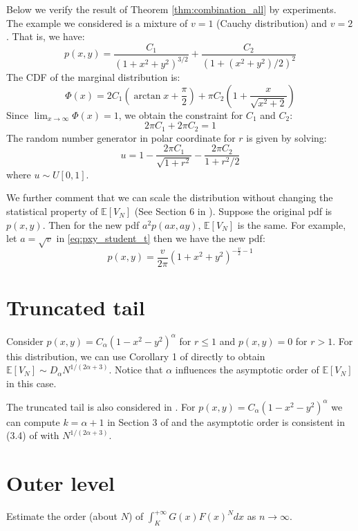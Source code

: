 \documentclass{article}
\def\E{\mathbb{E}}
\begin{document}
Below we verify the result of Theorem \ref{thm:combination_all}
by experiments. The example we considered is a mixture of $v=1$
(Cauchy distribution) and $v=2$. That is, we have:
\begin{equation}
    p(x,y) = \frac{C_1}{(1+x^2+y^2)^{3/2}}
    + \frac{C_2}{(1+(x^2+y^2)/2)^{2}}
\end{equation}
The CDF of the marginal distribution is:
\begin{equation}
    \Phi(x) = 2C_1 (\arctan x + \frac{\pi}{2})
    + \pi C_2 (1 + \frac{x}{\sqrt{x^2 + 2}})
\end{equation}
Since $\lim_{x\to \infty} \Phi(x) = 1$,
we obtain the constraint for $C_1$ and $C_2$:
\begin{equation}
2\pi C_1 + 2 \pi C_2 = 1    
\end{equation}
The random number generator in polar coordinate
for $r$ is given by solving:
\begin{equation}
    u = 1 - \frac{2\pi C_1}{\sqrt{1+r^2}} - \frac{2\pi C_2}{1+r^2/2}
\end{equation}
where $u\sim U[0,1]$.

We further comment that we can scale the distribution
without changing the statistical property of $\E[V_N]$
(See Section 6 in \cite{efron1965convex}).
Suppose the original pdf is $p(x,y)$. Then for the new
pdf $a^2 p(ax, ay)$, $\E[V_N]$ is the same.
For example,  let $a=\sqrt{v}$ in 
\eqref{eq:pxy_student_t} then we have the new
pdf:
\begin{equation}
    p(x,y)= \frac{v}{2\pi}(1+x^2+y^2)^{-\frac{v}{2}-1}
\end{equation}

\section{Truncated tail}
Consider  $p(x,y) = C_{\alpha}(1-x^2-y^2)^{\alpha}$ for $r\leq 1$
and $p(x,y)=0$ for $r>1$.
For this distribution, we can use
Corollary 1 of \cite{affentranger1991convex}
directly to obtain
$\E[V_N] \sim D_{\alpha} N^{1/(2\alpha + 3)}$.
Notice that $\alpha$ influences the asymptotic order of
$\E[V_N]$ in this case.

The truncated tail is also considered in \cite{carnal1970konvexe}.
For $p(x,y) = C_{\alpha}(1-x^2-y^2)^{\alpha}$ 
we can compute $k=\alpha + 1$ in Section 3 of \cite{carnal1970konvexe}
and the asymptotic order is consistent in (3.4) of \cite{carnal1970konvexe}
with $N^{1/(2\alpha+3)}$.

\section{Outer level}
Estimate the order (about $N$)
of $\int_K^{+\infty} G(x)
F(x)^N dx
$ as $n\to \infty$.
\end{document}

